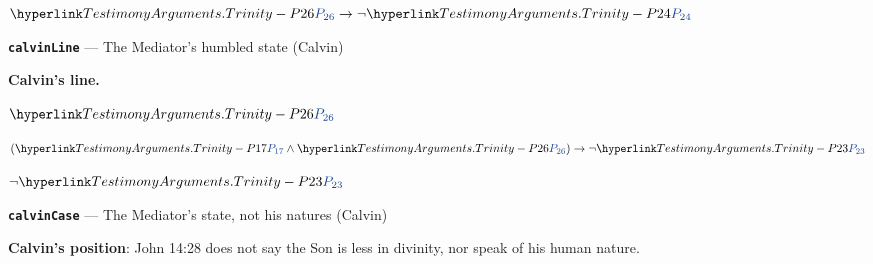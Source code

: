 \documentclass[11pt,paper=\testimonypaper,DIV=13,parskip=false]{scrartcl}
\begin{document}
\begin{derivation}
  \item[] \(\pvar{TestimonyArguments.Trinity}{26} \rightarrow \lnot \pvar{TestimonyArguments.Trinity}{24}\)
\end{derivation}
\par\medskip\noindent\textbf{\texttt{calvin\allowbreak{}Line}} --- The Mediator’s humbled state (Calvin)\par\nobreak\noindent
\textbf{Calvin’s line.}

\begin{derivation}
  \item[(1)] \(\pvar{TestimonyArguments.Trinity}{26}\)
  \item[(2)] \((\pvar{TestimonyArguments.Trinity}{17} \land \pvar{TestimonyArguments.Trinity}{26}) \rightarrow \lnot \pvar{TestimonyArguments.Trinity}{23}\)
  \item[\(\vdash\)] \(\lnot \pvar{TestimonyArguments.Trinity}{23}\)
\end{derivation}
\par\medskip\noindent\textbf{\texttt{calvin\allowbreak{}Case}} --- The Mediator’s state, not his natures (Calvin)\par\nobreak\noindent
\textbf{Calvin’s position}: John 14:28 does not say the Son is less in divinity, nor speak of his human nature.
\end{document}
